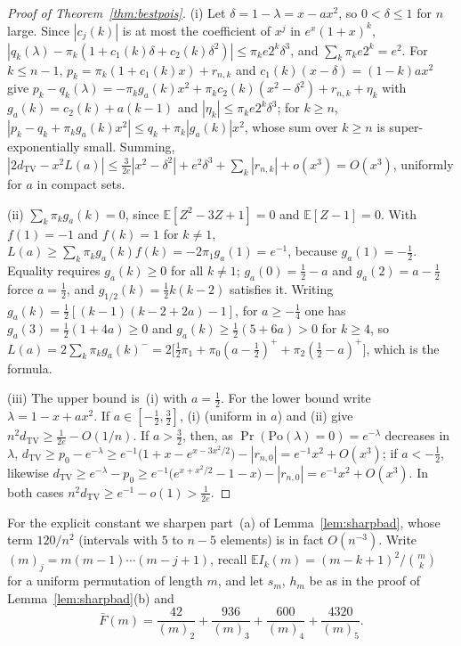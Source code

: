 \begin{proof}[Proof of Theorem~\ref{thm:bestpois}]
(i) Let $\delta=1-\lambda=x-ax^2$, so $0<\delta\le1$ for $n$ large. Since $|c_j(k)|$ is at most the coefficient of $x^j$ in $e^x(1+x)^k$, $|q_k(\lambda)-\pi_k(1+c_1(k)\delta+c_2(k)\delta^2)|\le\pi_ke2^k\delta^3$, and $\sum_k\pi_ke2^k=e^2$. For $k\le n-1$, $p_k=\pi_k(1+c_1(k)x)+r_{n,k}$ and $c_1(k)(x-\delta)=(1-k)ax^2$ give $p_k-q_k(\lambda)=-\pi_kg_a(k)x^2+\pi_kc_2(k)(x^2-\delta^2)+r_{n,k}+\eta_k$ with $g_a(k)=c_2(k)+a(k-1)$ and $|\eta_k|\le\pi_ke2^k\delta^3$; for $k\ge n$, $|p_k-q_k+\pi_kg_a(k)x^2|\le q_k+\pi_k|g_a(k)|x^2$, whose sum over $k\ge n$ is super-exponentially small. Summing, $|2d_{\mathrm{TV}}-x^2L(a)|\le\frac3{2e}|x^2-\delta^2|+e^2\delta^3+\sum_k|r_{n,k}|+o(x^3)=O(x^3)$, uniformly for $a$ in compact sets.

(ii) $\sum_k\pi_kg_a(k)=0$, since $\mathbb E[Z^2-3Z+1]=0$ and $\mathbb E[Z-1]=0$. With $f(1)=-1$ and $f(k)=1$ for $k\ne1$, $L(a)\ge\sum_k\pi_kg_a(k)f(k)=-2\pi_1g_a(1)=e^{-1}$, because $g_a(1)=-\tfrac12$. Equality requires $g_a(k)\ge0$ for all $k\ne1$; $g_a(0)=\tfrac12-a$ and $g_a(2)=a-\tfrac12$ force $a=\tfrac12$, and $g_{1/2}(k)=\tfrac12k(k-2)$ satisfies it. Writing $g_a(k)=\tfrac12[(k-1)(k-2+2a)-1]$, for $a\ge-\tfrac14$ one has $g_a(3)=\tfrac12(1+4a)\ge0$ and $g_a(k)\ge\tfrac12(5+6a)>0$ for $k\ge4$, so $L(a)=2\sum_k\pi_kg_a(k)^-=2\bigl[\tfrac12\pi_1+\pi_0(a-\tfrac12)^++\pi_2(\tfrac12-a)^+\bigr]$, which is the formula.

(iii) The upper bound is~(i) with $a=\tfrac12$. For the lower bound write $\lambda=1-x+ax^2$. If $a\in[-\tfrac12,\tfrac32]$, (i) (uniform in $a$) and (ii) give $n^2d_{\mathrm{TV}}\ge\frac1{2e}-O(1/n)$. If $a>\tfrac32$, then, as $\Pr(\mathrm{Po}(\lambda)=0)=e^{-\lambda}$ decreases in $\lambda$, $d_{\mathrm{TV}}\ge p_0-e^{-\lambda}\ge e^{-1}\bigl(1+x-e^{x-3x^2/2}\bigr)-|r_{n,0}|=e^{-1}x^2+O(x^3)$; if $a<-\tfrac12$, likewise $d_{\mathrm{TV}}\ge e^{-\lambda}-p_0\ge e^{-1}\bigl(e^{x+x^2/2}-1-x\bigr)-|r_{n,0}|=e^{-1}x^2+O(x^3)$. In both cases $n^2d_{\mathrm{TV}}\ge e^{-1}-o(1)>\frac1{2e}$.
\end{proof}

\noindent For the explicit constant we sharpen part~(a) of Lemma~\ref{lem:sharpbad}, whose term $120/n^2$ (intervals with $5$ to $n-5$ elements) is in fact $O(n^{-3})$. Write $(m)_j=m(m-1)\cdots(m-j+1)$, recall $\mathbb EI_k(m)=(m-k+1)^2/\binom mk$ for a uniform permutation of length $m$, and let $s_m$, $h_m$ be as in the proof of Lemma~\ref{lem:sharpbad}(b) and
\[
\bar F(m)=\frac{42}{(m)_2}+\frac{936}{(m)_3}+\frac{600}{(m)_4}+\frac{4320}{(m)_5}.
\]

